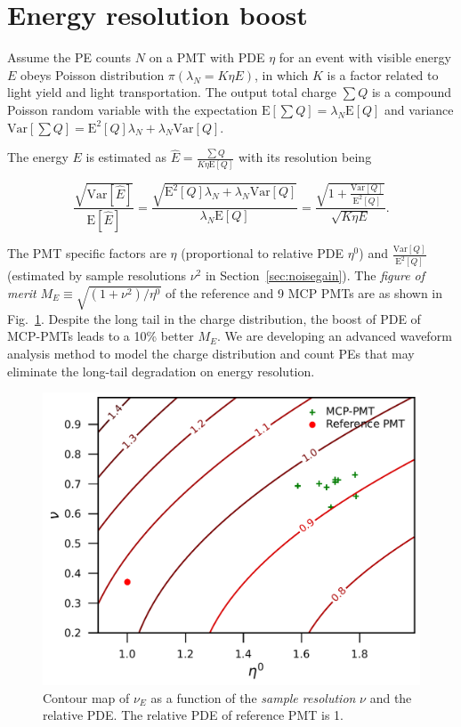 \section{Energy resolution boost}
\label{Result}
Assume the PE counts $N$ on a PMT with PDE $\eta$ for an event with visible energy $E$ obeys Poisson distribution $\pi(\lambda_N=K\eta E)$, in which $K$ is a factor related to light yield and light transportation. The output total charge $\sum{Q}$ is a compound Poisson random variable with the expectation $\mathrm{E}[\sum{Q}]=\lambda_N\mathrm{E}[Q]$ and variance $\mathrm{Var}[\sum{Q}]=\mathrm{E}^2[Q]\lambda_N+\lambda_N\mathrm{Var}[Q]$.

The energy $E$ is estimated as $\hat{E}=\frac{\sum{Q}}{K\eta\mathrm{E}[Q]}$ with its resolution being

\begin{equation}
    \frac{\sqrt{\mathrm{Var}[\hat{E}]}}{\mathrm{E}[\hat{E}]}=\frac{\sqrt{\mathrm{E}^2[Q]\lambda_N+\lambda_N\mathrm{Var}[Q]}}{\lambda_N\mathrm{E}[Q]}=\frac{\sqrt{1+\frac{\mathrm{Var}[Q]}{\mathrm{E}^2[Q]}}}{\sqrt{K\eta E}}.
\end{equation}

The PMT specific factors are $\eta$ (proportional to relative PDE $\eta^0$) and $\frac{\mathrm{Var}[Q]}{\mathrm{E}^2[Q]}$ (estimated by sample resolutions $\nu^2$ in Section~\ref{sec:noisegain}). The \emph{figure of merit} $M_{E}\equiv\sqrt{({1+\nu^2})/{\eta^0}}$ of the reference and 9 MCP PMTs are as shown in Fig.~\ref{fig:EnergyResolution}. Despite the long tail in the charge distribution, the boost of PDE of MCP-PMTs leads to a 10\% better $M_{E}$. We are developing an advanced waveform analysis method to model the charge distribution and count PEs that may eliminate the long-tail degradation on energy resolution.
\begin{figure}[!htbp]
    \centering
    \includegraphics[width=\MF\textwidth]{figures/result/resolution.pdf}
    \caption{Contour map of $\nu_{E}$ as a function of the \emph{sample resolution} $\nu$ and the relative PDE. The relative PDE of reference PMT is 1.}
    \label{fig:EnergyResolution}
\end{figure}
